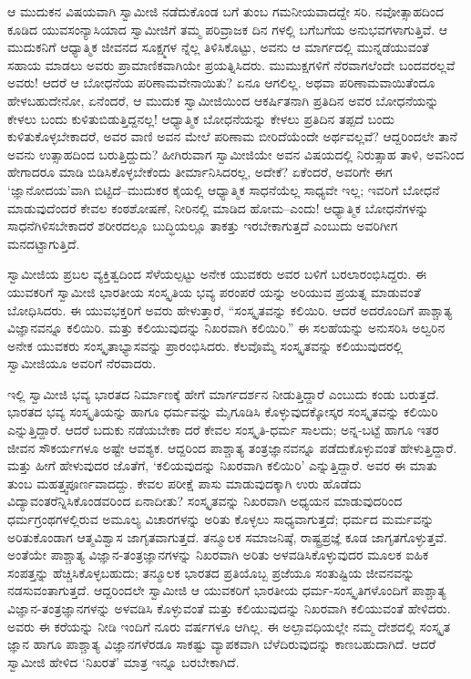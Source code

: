 ಆ ಮುದುಕನ ವಿಷಯವಾಗಿ ಸ್ವಾಮೀಜಿ ನಡೆದುಕೊಂಡ ಬಗೆ ತುಂಬ ಗಮನೀಯವಾದದ್ದೇ ಸರಿ. ನವೋತ್ಸಾಹದಿಂದ ಕೂಡಿದ ಯುವಸಂನ್ಯಾಸಿಯಾದ ಸ್ವಾಮೀಜಿಗೆ ತಮ್ಮ ಪರಿವ್ರಾಜಕ ದಿನ ಗಳಲ್ಲಿ ಬಗೆಬಗೆಯ ಅನುಭವಗಳಾಗುತ್ತಿವೆ. ಆ ಮುದುಕನಿಗೆ ಆಧ್ಯಾತ್ಮಿಕ ಜೀವನದ ಸೂಕ್ಷ್ಮಗಳ ನ್ನೆಲ್ಲ ತಿಳಿಸಿಕೊಟ್ಟು, ಅವನು ಆ ಮಾರ್ಗದಲ್ಲಿ ಮುನ್ನಡೆಯುವಂತೆ ಸಹಾಯ ಮಾಡಲು ಅವರು ಪ್ರಾಮಾಣಿಕವಾಗಿಯೇ ಪ್ರಯತ್ನಿಸಿದರು. ಮುಮುಕ್ಷಗಳಿಗೆ ನೆರವಾಗಲೆಂದೇ ಬಂದವರಲ್ಲವೆ ಅವರು! ಆದರೆ ಆ ಬೋಧನೆಯ ಪರಿಣಾಮವೇನಾಯಿತು? ಏನೂ ಆಗಲಿಲ್ಲ. ಅಥವಾ ಪರಿಣಾಮವಾಯಿತೆಂದೂ ಹೇಳಬಹುದೇನೋ, ಏನೆಂದರೆ, ಆ ಮುದುಕ ಸ್ವಾಮೀಜಿಯಿಂದ ಆಕರ್ಷಿತನಾಗಿ ಪ್ರತಿದಿನ ಅವರ ಬೋಧನೆಯನ್ನು ಕೇಳಲು ಬಂದು ಕುಳಿತುಬಿಡುತ್ತಿದ್ದನಲ್ಲ! ಆಧ್ಯಾತ್ಮಿಕ ಬೋಧನೆಯನ್ನು ಕೇಳಲು ಪ್ರತಿದಿನ ತಪ್ಪದೆ ಬಂದು ಕುಳಿತುಕೊಳ್ಳಬೇಕಾದರೆ, ಅವರ ವಾಣಿ ಅವನ ಮೇಲೆ ಪರಿಣಾಮ ಬೀರಿದೆಯೆಂದೇ ಅರ್ಥವಲ್ಲವೆ? ಆದ್ದರಿಂದಲೇ ತಾನೆ ಅವನು ಉತ್ಸಾಹದಿಂದ ಬರುತ್ತಿದ್ದುದು? ಹೀಗಿರುವಾಗ ಸ್ವಾಮೀಜಿಯೇ ಅವನ ವಿಷಯದಲ್ಲಿ ನಿರುತ್ಸಾಹ ತಾಳಿ, ಅವನಿಂದ ಹೇಗಾದರೂ ಮಾಡಿ ಬಿಡಿಸಿಕೊಳ್ಳಬೇಕೆಂದು ತೀರ್ಮಾನಿಸಿದರಲ್ಲ, ಅದೇಕೆ? ಏಕೆಂದರೆ, ಅವರಿಗೇ ಈಗ ‘ಜ್ಞಾನೋದಯ’ವಾಗಿ ಬಿಟ್ಟಿದೆ–ಮುದುಕರ ಕೈಯಲ್ಲಿ ಆಧ್ಯಾತ್ಮಿಕ ಸಾಧನೆಯೆಲ್ಲ ಸಾಧ್ಯವೇ ಇಲ್ಲ; ಇವರಿಗೆ ಬೋಧನೆ ಮಾಡುವುದೆಂದರೆ ಕೇವಲ ಕಂಠಶೋಷಣೆ, ನೀರಿನಲ್ಲಿ ಮಾಡಿದ ಹೋಮ–ಎಂದು! ಆಧ್ಯಾತ್ಮಿಕ ಬೋಧನೆಗಳನ್ನು ಸಾಧನೆಗಿಳಿಸಬೇಕಾದರೆ ಶರೀರದಲ್ಲೂ ಬುದ್ಧಿಯಲ್ಲೂ ತಾಕತ್ತು ಇರಬೇಕಾಗುತ್ತದೆ ಎಂಬುದು ಅವರಿಗೀಗ ಮನದಟ್ಟಾಗುತ್ತಿದೆ.

ಸ್ವಾಮೀಜಿಯ ಪ್ರಬಲ ವ್ಯಕ್ತಿತ್ವದಿಂದ ಸೆಳೆಯಲ್ಪಟ್ಟು ಅನೇಕ ಯುವಕರು ಅವರ ಬಳಿಗೆ ಬರಲಾರಂಭಿಸಿದ್ದರು. ಈ ಯುವಕರಿಗೆ ಸ್ವಾಮೀಜಿ ಭಾರತೀಯ ಸಂಸ್ಕೃತಿಯ ಭವ್ಯ ಪರಂಪರೆ ಯನ್ನು ಅರಿಯುವ ಪ್ರಯತ್ನ ಮಾಡುವಂತೆ ಬೋಧಿಸಿದರು. ಈ ಯುವಭಕ್ತರಿಗೆ ಅವರು ಹೇಳುತ್ತಾರೆ, “ಸಂಸ್ಕೃತವನ್ನು ಕಲಿಯಿರಿ. ಆದರೆ ಅದರೊಂದಿಗೆ ಪಾಶ್ಚಾತ್ಯ ವಿಜ್ಞಾನವನ್ನೂ ಕಲಿಯಿರಿ. ಮತ್ತು ಕಲಿಯುವುದನ್ನು ನಿಖರವಾಗಿ ಕಲಿಯಿರಿ.” ಈ ಸಲಹೆಯನ್ನು ಅನುಸರಿಸಿ ಅಲ್ವರಿನ ಅನೇಕ ಯುವಕರು ಸಂಸ್ಕೃತಾಭ್ಯಾಸವನ್ನು ಪ್ರಾರಂಭಿಸಿದರು. ಕೆಲವೊಮ್ಮೆ ಸಂಸ್ಕೃತವನ್ನು ಕಲಿಯುವುದರಲ್ಲಿ ಸ್ವಾಮೀಜಿಯೂ ಅವರಿಗೆ ನೆರವಾದರು.

ಇಲ್ಲಿ ಸ್ವಾಮೀಜಿ ಭವ್ಯ ಭಾರತದ ನಿರ್ಮಾಣಕ್ಕೆ ಹೇಗೆ ಮಾರ್ಗದರ್ಶನ ನೀಡುತ್ತಿದ್ದಾರೆ ಎಂಬುದು ಕಂಡು ಬರುತ್ತದೆ. ಭಾರತದ ಭವ್ಯ ಸಂಸ್ಕೃತಿಯನ್ನು ಹಾಗೂ ಧರ್ಮವನ್ನು ಮೈಗೂಡಿಸಿ ಕೊಳ್ಳುವುದಕ್ಕೋಸ್ಕರ ಸಂಸ್ಕೃತವನ್ನು ಕಲಿಯಿರಿ ಎನ್ನುತ್ತಿದ್ದಾರೆ. ಆದರೆ ಬದುಕು ನಡೆಯಬೇಕಾ ದರೆ ಕೇವಲ ಸಂಸ್ಕೃತಿ-ಧರ್ಮ ಸಾಲದು; ಅನ್ನ-ಬಟ್ಟೆ ಹಾಗೂ ಇತರ ಜೀವನ ಸೌಕರ್ಯಗಳೂ ಅಷ್ಟೇ ಆವಶ್ಯಕ. ಆದ್ದರಿಂದ ಪಾಶ್ಚಾತ್ಯ ತಂತ್ರಜ್ಞಾನವನ್ನೂ ಪಡೆದುಕೊಳ್ಳುವಂತೆ ಹೇಳುತ್ತಿದ್ದಾರೆ. ಮತ್ತು ಹೀಗೆ ಹೇಳುವುದರ ಜೊತೆಗೆ, ‘ಕಲಿಯವುದನ್ನು ನಿಖರವಾಗಿ ಕಲಿಯಿರಿ’ ಎನ್ನುತ್ತಿದ್ದಾರೆ. ಅವರ ಈ ಮಾತು ತುಂಬ ಮಹತ್ತ್ವಪೂರ್ಣವಾದದ್ದು. ಕೇವಲ ಪರೀಕ್ಷೆ ಪಾಸು ಮಾಡುವುದಕ್ಕಾಗಿ ಉರು ಹೊಡೆದು ವಿದ್ಯಾವಂತರೆನ್ನಿಸಿಕೊಂಡವರಿಂದ ಏನಾದೀತು? ಸಂಸ್ಕೃತವನ್ನು ನಿಖರವಾಗಿ ಅಧ್ಯಯನ ಮಾಡುವುದರಿಂದ ಧರ್ಮಗ್ರಂಥಗಳಲ್ಲಿರುವ ಅಮೂಲ್ಯ ವಿಚಾರಗಳನ್ನು ಅರಿತು ಕೊಳ್ಳಲು ಸಾಧ್ಯವಾಗುತ್ತದೆ; ಧರ್ಮದ ಮರ್ಮವನ್ನು ಅರಿತುಕೊಂಡಾಗ ಆತ್ಮವಿಶ್ವಾಸ ಜಾಗೃತವಾಗುತ್ತದೆ. ತನ್ಮೂಲಕ ಸಮಾಜನಿಷ್ಠೆ, ರಾಷ್ಟ್ರಪ್ರಜ್ಞೆ ಕೂಡ ಜಾಗೃತಗೊಳ್ಳುತ್ತವೆ. ಅಂತೆಯೇ ಪಾಶ್ಚಾತ್ಯ ವಿಜ್ಞಾನ-ತಂತ್ರಜ್ಞಾನಗಳನ್ನು ನಿಖರವಾಗಿ ಅರಿತು ಅಳವಡಿಸಿಕೊಳ್ಳುವುದರ ಮೂಲಕ ಐಹಿಕ ಸಂಪತ್ತನ್ನು ಹೆಚ್ಚಿಸಿಕೊಳ್ಳಬಹುದು; ತನ್ಮೂಲಕ ಭಾರತದ ಪ್ರತಿಯೊಬ್ಬ ಪ್ರಜೆಯೂ ಸಂತುಷ್ಟಿಯ ಜೀವನವನ್ನು ನಡಸುವಂತಾಗುತ್ತದೆ. ಆದ್ದರಿಂದಲೇ ಸ್ವಾಮೀಜಿ ಆ ಯುವಕರಿಗೆ ಭಾರತೀಯ ಧರ್ಮ-ಸಂಸ್ಕೃತಿಗಳೊಂದಿಗೆ ಪಾಶ್ಚಾತ್ಯ ವಿಜ್ಞಾನ-ತಂತ್ರಜ್ಞಾನಗಳನ್ನು ಅಳವಡಿಸಿ ಕೊಳ್ಳುವಂತೆ ಮತ್ತು ಕಲಿಯುವುದನ್ನು ನಿಖರವಾಗಿ ಕಲಿಯುವಂತೆ ಹೇಳಿದರು. ಅವರು ಈ ಕರೆಯನ್ನು ನೀಡಿ ಇಂದಿಗೆ ನೂರು ವರ್ಷಗಳೂ ಆಗಿಲ್ಲ. ಈ ಅಲ್ಪಾವಧಿಯಲ್ಲೇ ನಮ್ಮ ದೇಶದಲ್ಲಿ ಸಂಸ್ಕೃತ ಜ್ಞಾನ ಹಾಗೂ ಪಾಶ್ಚಾತ್ಯ ವಿಜ್ಞಾನಗಳೆರಡೂ ಸಾಕಷ್ಟು ವ್ಯಾಪಕವಾಗಿ ಬೆಳೆದಿರುವುದನ್ನು ಕಾಣಬಹುದಾಗಿದೆ. ಆದರೆ ಸ್ವಾಮೀಜಿ ಹೇಳಿದ ‘ನಿಖರತೆ’ ಮಾತ್ರ ಇನ್ನೂ ಬರಬೇಕಾಗಿದೆ.

